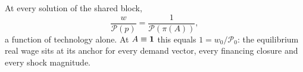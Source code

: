 \begin{corollary}\label{cor:realwage}
At every solution of the shared block,
\begin{equation}
\frac{w}{\mathcal{P}(p)} = \frac{1}{\mathcal{P}(\pi(A))},
\end{equation}
a function of technology alone. At $A \equiv \mathbf{1}$ this equals $1 =
w_0/\mathcal{P}_0$: the equilibrium real wage sits at its anchor for every demand
vector, every financing closure and every shock magnitude.
\end{corollary}


